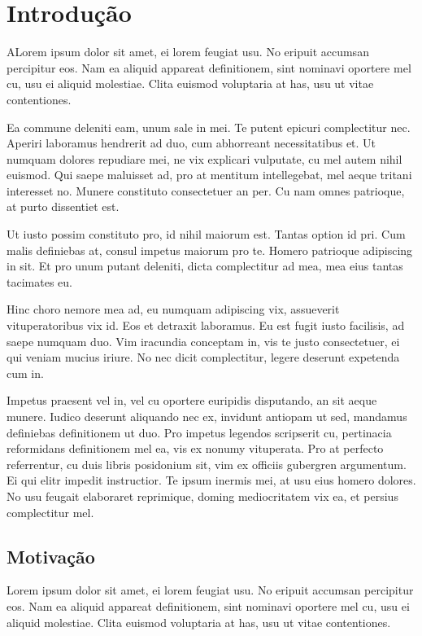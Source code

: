 \chapter{Introdução}
\label{cap:introducao}

	ALorem ipsum dolor sit amet, ei lorem feugiat usu. No eripuit accumsan percipitur eos. Nam ea aliquid appareat definitionem, sint nominavi oportere mel cu, usu ei aliquid molestiae. Clita euismod voluptaria at has, usu ut vitae contentiones.

	Ea commune deleniti eam, unum sale in mei. Te putent epicuri complectitur nec. Aperiri laboramus hendrerit ad duo, cum abhorreant necessitatibus et. Ut numquam dolores repudiare mei, ne vix explicari vulputate, cu mel autem nihil euismod. Qui saepe maluisset ad, pro at mentitum intellegebat, mel aeque tritani interesset no. Munere constituto consectetuer an per. Cu nam omnes patrioque, at purto dissentiet est.

	Ut iusto possim constituto pro, id nihil maiorum est. Tantas option id pri. Cum malis definiebas at, consul impetus maiorum pro te. Homero patrioque adipiscing in sit. Et pro unum putant deleniti, dicta complectitur ad mea, mea eius tantas tacimates eu.

	Hinc choro nemore mea ad, eu numquam adipiscing vix, assueverit vituperatoribus vix id. Eos et detraxit laboramus. Eu est fugit iusto facilisis, ad saepe numquam duo. Vim iracundia conceptam in, vis te justo consectetuer, ei qui veniam mucius iriure. No nec dicit complectitur, legere deserunt expetenda cum in.

	Impetus praesent vel in, vel cu oportere euripidis disputando, an sit aeque munere. Iudico deserunt aliquando nec ex, invidunt antiopam ut sed, mandamus definiebas definitionem ut duo. Pro impetus legendos scripserit cu, pertinacia reformidans definitionem mel ea, vis ex nonumy vituperata. Pro at perfecto referrentur, cu duis libris posidonium sit, vim ex officiis gubergren argumentum. Ei qui elitr impedit instructior. Te ipsum inermis mei, at usu eius homero dolores. No usu feugait elaboraret reprimique, doming mediocritatem vix ea, et persius complectitur mel.

	\section{Motivação}
	\label{sec:motivacao}

		Lorem ipsum dolor sit amet, ei lorem feugiat usu. No eripuit accumsan percipitur eos. Nam ea aliquid appareat definitionem, sint nominavi oportere mel cu, usu ei aliquid molestiae. Clita euismod voluptaria at has, usu ut vitae contentiones.

